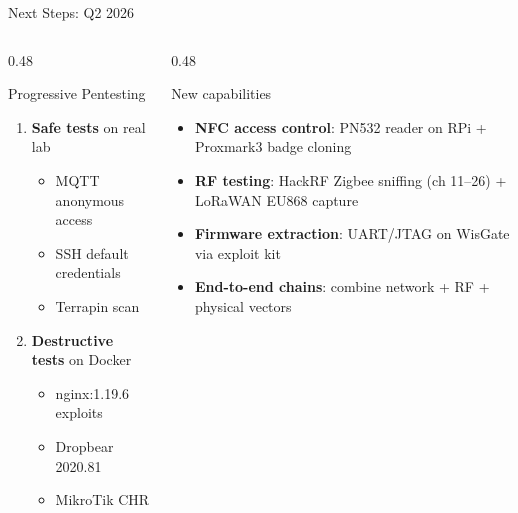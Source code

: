 \documentclass[aspectratio=169]{beamer}
\begin{document}
\begin{frame}{Next Steps: Q2 2026}

\begin{columns}[T]
\begin{column}{0.48\textwidth}
\begin{block}{Progressive Pentesting}
\begin{enumerate}
    \item \textbf{Safe tests} on real lab
    \begin{itemize}
        \small
        \item MQTT anonymous access
        \item SSH default credentials
        \item Terrapin scan
    \end{itemize}
    \item \textbf{Destructive tests} on Docker
    \begin{itemize}
        \small
        \item nginx:1.19.6 exploits
        \item Dropbear 2020.81
        \item MikroTik CHR
    \end{itemize}
\end{enumerate}
\end{block}
\end{column}

\begin{column}{0.48\textwidth}
\begin{block}{New capabilities}
\begin{itemize}
    \item \textbf{NFC access control}: PN532 reader on RPi + Proxmark3 badge cloning
    \item \textbf{RF testing}: HackRF Zigbee sniffing (ch 11--26) + LoRaWAN EU868 capture
    \item \textbf{Firmware extraction}: UART/JTAG on WisGate via exploit kit
    \item \textbf{End-to-end chains}: combine network + RF + physical vectors
\end{itemize}
\end{block}
\end{column}
\end{columns}
\end{frame}
\end{document}
